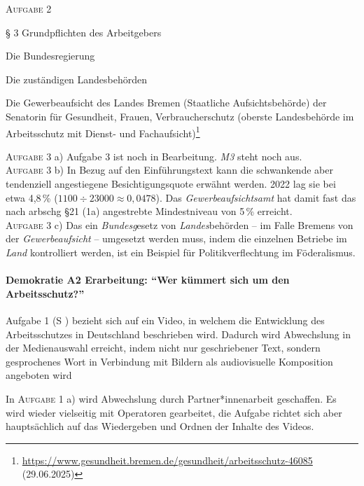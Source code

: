 \textsc{Aufgabe 2} \quad
\begin{myitemize}
    \item § 3 Grundpflichten des Arbeitgebers
    \item Die Bundesregierung
    \item Die zuständigen Landesbehörden
    \item Die Gewerbeaufsicht des Landes Bremen (Staatliche Aufsichtsbehörde) der Senatorin für Gesundheit, Frauen, Verbraucherschutz (oberste Landesbehörde im Arbeitsschutz mit Dienst- und Fachaufsicht)\footnote{\url{https://www.gesundheit.bremen.de/gesundheit/arbeitsschutz-46085} (29.06.2025)}
\end{myitemize}


\textsc{Aufgabe 3} a) \quad
Aufgabe 3 ist noch in Bearbeitung. \emph{M3} steht noch aus.
\\

\textsc{Aufgabe 3} b) \quad
In Bezug auf den Einführungstext kann die schwankende aber tendenziell angestiegene Besichtigungsquote erwähnt werden. 2022 lag sie bei etwa 4,8\,\% ($1100 \div 23000 \approx 0,0478$). Das \emph{Gewerbeaufsichtsamt} hat damit fast das nach \gls{arbschg} §21 (1a) angestrebte Mindestniveau von 5\,\% erreicht. 
\\

\textsc{Aufgabe 3} c) \quad
Das ein \emph{Bundesg}esetz von \emph{Landes}behörden -- im Falle Bremens von der \emph{Gewerbeaufsicht} -- umgesetzt werden muss, indem die einzelnen Betriebe im \emph{Land} kontrolliert werden, ist ein Beispiel für Politikverflechtung im Föderalismus. 



\paragraph{Demokratie A2 Erarbeitung: \enquote{Wer kümmert sich um den Arbeitsschutz?}}
Aufgabe 1 (\gls{S} \pageref{DEMOKRATIE-A2}) bezieht sich auf ein Video, in welchem die Entwicklung des Arbeitsschutzes in Deutschland beschrieben wird. 
Dadurch wird Abwechslung in der Medienauswahl erreicht, indem nicht nur geschriebener Text, sondern gesprochenes Wort in Verbindung mit Bildern als audiovisuelle Komposition angeboten wird

In \textsc{Aufgabe 1} a) wird Abwechslung durch Partner*innenarbeit geschaffen.
Es wird wieder vielseitig mit Operatoren gearbeitet, die Aufgabe richtet sich aber hauptsächlich auf das Wiedergeben und Ordnen der Inhalte des Videos.

